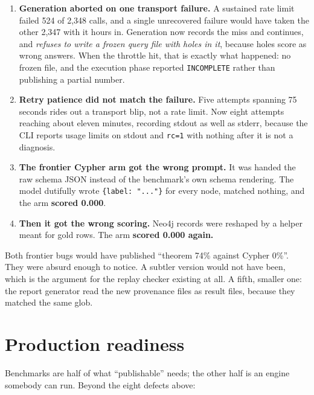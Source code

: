 \documentclass[11pt]{article}
\begin{document}
\begin{enumerate}
  \item \textbf{Generation aborted on one transport failure.} A sustained rate
    limit failed 524 of 2{,}348 calls, and a single unrecovered failure would
    have taken the other 2{,}347 with it hours in. Generation now records the
    miss and continues, and \emph{refuses to write a frozen query file with holes
    in it}, because holes score as wrong answers. When the throttle hit, that is
    exactly what happened: no frozen file, and the execution phase reported
    \texttt{INCOMPLETE} rather than publishing a partial number.
  \item \textbf{Retry patience did not match the failure.} Five attempts spanning
    75 seconds rides out a transport blip, not a rate limit. Now eight attempts
    reaching about eleven minutes, recording stdout as well as stderr, because
    the CLI reports usage limits on stdout and \texttt{rc=1} with nothing after
    it is not a diagnosis.
  \item \textbf{The frontier Cypher arm got the wrong prompt.} It was handed the
    raw schema JSON instead of the benchmark's own schema rendering. The model
    dutifully wrote \texttt{\{label: "..."\}} for every node, matched nothing,
    and the arm \textbf{scored 0.000}.
  \item \textbf{Then it got the wrong scoring.} Neo4j records were reshaped by a
    helper meant for gold rows. The arm \textbf{scored 0.000 again.}
\end{enumerate}

Both frontier bugs would have published ``theorem 74\% against Cypher 0\%''. They
were absurd enough to notice. A subtler version would not have been, which is the
argument for the replay checker existing at all. A fifth, smaller one: the report
generator read the new provenance files as result files, because they matched the
same glob.

\section{Production readiness}

Benchmarks are half of what ``publishable'' needs; the other half is an engine
somebody can run. Beyond the eight defects above:
\end{document}
